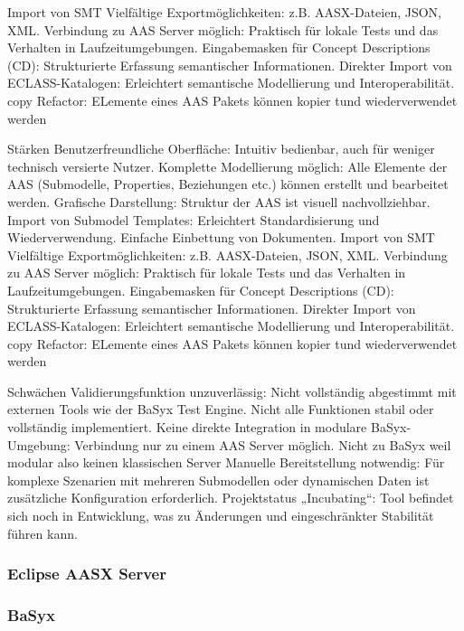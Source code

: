 Import von SMT
Vielfältige Exportmöglichkeiten: z.B. AASX-Dateien, JSON, XML.
Verbindung zu AAS Server möglich: Praktisch für lokale Tests und das Verhalten in Laufzeitumgebungen.
Eingabemasken für Concept Descriptions (CD): Strukturierte Erfassung semantischer Informationen.
Direkter Import von ECLASS-Katalogen: Erleichtert semantische Modellierung und Interoperabilität.
copy Refactor: ELemente eines AAS Pakets können kopier tund wiederverwendet werden





Stärken
Benutzerfreundliche Oberfläche: Intuitiv bedienbar, auch für weniger technisch versierte Nutzer.
Komplette Modellierung möglich: Alle Elemente der AAS (Submodelle, Properties, Beziehungen etc.) können erstellt und bearbeitet werden.
Grafische Darstellung: Struktur der AAS ist visuell nachvollziehbar.
Import von Submodel Templates: Erleichtert Standardisierung und Wiederverwendung.
Einfache Einbettung von Dokumenten.
Import von SMT
Vielfältige Exportmöglichkeiten: z.B. AASX-Dateien, JSON, XML.
Verbindung zu AAS Server möglich: Praktisch für lokale Tests und das Verhalten in Laufzeitumgebungen.
Eingabemasken für Concept Descriptions (CD): Strukturierte Erfassung semantischer Informationen.
Direkter Import von ECLASS-Katalogen: Erleichtert semantische Modellierung und Interoperabilität.
copy Refactor: ELemente eines AAS Pakets können kopier tund wiederverwendet werden


Schwächen
Validierungsfunktion unzuverlässig: Nicht vollständig abgestimmt mit externen Tools wie der BaSyx Test Engine.
Nicht alle Funktionen stabil oder vollständig implementiert.
Keine direkte Integration in modulare BaSyx-Umgebung: Verbindung nur zu einem AAS Server möglich. Nicht zu BaSyx weil modular also keinen klassischen Server
Manuelle Bereitstellung notwendig: Für komplexe Szenarien mit mehreren Submodellen oder dynamischen Daten ist zusätzliche Konfiguration erforderlich.
Projektstatus „Incubating“: Tool befindet sich noch in Entwicklung, was zu Änderungen und eingeschränkter Stabilität führen kann.

\subsubsection{Eclipse AASX Server}
\subsubsection{BaSyx}